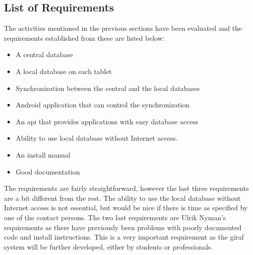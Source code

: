 \subsection{List of Requirements}
\label{sub:list_of_requirements}
The activities mentioned in the previous sections have been evaluated and the requirements established from these are listed below:

\begin{itemize}
	\item A central database
	\item A local database on each tablet		
	\item Synchronization between the central and the local databases
	\item Android application that can control the synchronization
	\item An \ac{api} that provides applications with easy database access
	\item Ability to use local database without Internet access.
	\item An install manual
	\item Good documentation
\end{itemize}

The requirements are fairly straightforward, however the last three requirements are a bit different from the rest. The ability to use the local database without Internet access is not essential, but would be nice if there is time as specified by one of the contact persons. The two last requirements are Ulrik Nyman's requirements as there have previously been problems with poorly documented code and install instructions. This is a very important requirement as the \ac{giraf} system will be further developed, either by students or professionals.
